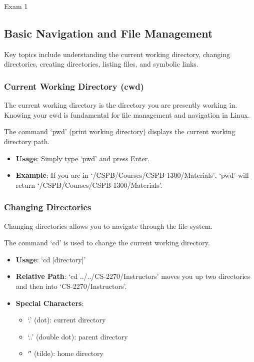 \begin{examnotes}{Exam 1}
    \subsection*{Basic Navigation and File Management}
    
    Key topics include understanding the current working directory, changing directories, creating directories, listing files, and symbolic links.
    
    \subsubsection*{Current Working Directory (cwd)}
    
    The current working directory is the directory you are presently working in. Knowing your cwd is fundamental for file management and navigation in Linux.
    
    \begin{highlight}
        The command `pwd' (print working directory) displays the current working directory path.
        
        \begin{itemize}
            \item \textbf{Usage}: Simply type `pwd' and press Enter.
            \item \textbf{Example}: If you are in `/CSPB/Courses/CSPB-1300/Materials', `pwd' will return `/CSPB/Courses/CSPB-1300/Materials'.
        \end{itemize}
    \end{highlight}
    
    \subsubsection*{Changing Directories}
    
    Changing directories allows you to navigate through the file system.
    
    \begin{highlight}
        The command `cd' is used to change the current working directory.
        
        \begin{itemize}
            \item \textbf{Usage}: `cd [directory]'
            \item \textbf{Relative Path}: `cd ../../CS-2270/Instructors' moves you up two directories and then into `CS-2270/Instructors'.
            \item \textbf{Special Characters}:
                \begin{itemize}
                    \item `.' (dot): current directory
                    \item `..' (double dot): parent directory
                    \item `\~' (tilde): home directory
                \end{itemize}
        \end{itemize}
    \end{highlight}
    

\end{examnotes}
